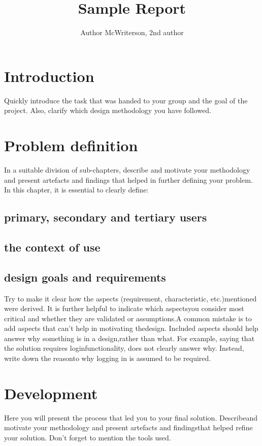 \documentclass[a4paper, 11pt]{article}
\title{Sample Report}
\author{Author McWriterson, 2nd author}
\begin{document}
\maketitle

\section{Introduction}
Quickly introduce the task that was handed to your group and the goal of the project. Also, clarify which design methodology you have followed.

\section{Problem definition}
In a suitable division of sub-chapters, describe and motivate your methodology and present artefacts and findings that helped in further defining
your problem. In this chapter, it is essential to clearly define:
\subsection{primary, secondary and tertiary users}

\subsection{the context of use}

\subsection{design goals and requirements}

Try to make it clear how the aspects (requirement, characteristic, etc.)mentioned were derived. It is further helpful to indicate which aspectsyou consider most critical and whether they are validated or assumptions.A common mistake is to add aspects that can’t help in motivating thedesign. Included aspects should help answer why something is in a design,rather than what. For example, saying that the solution requires loginfunctionality, does not clearly answer why. Instead, write down the reasonto why logging in is assumed to be required.
\section{Development}
Here you will present the process that led you to your final solution. Describeand motivate your methodology and present artefacts and findingsthat helped refine your solution. Don't forget to mention the tools used.
\end{document}
